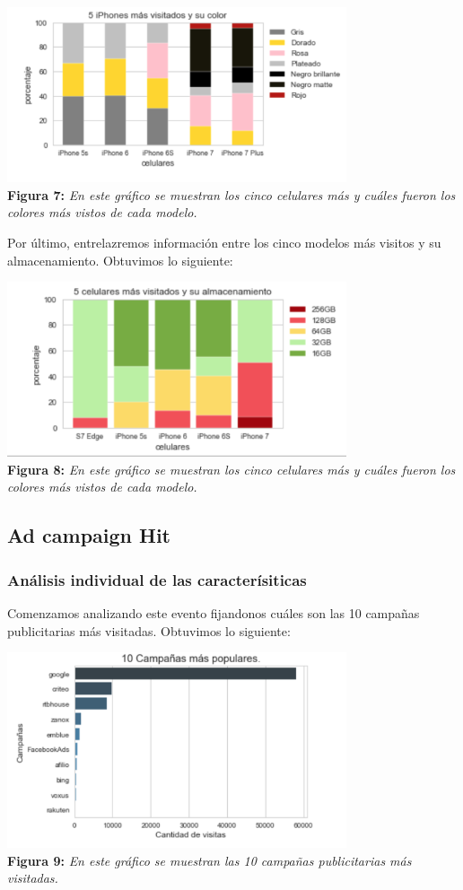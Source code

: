 \documentclass[titlepage,a4paper]{article}
\begin{document}
	\begin{center}
	\includegraphics[width=10cm]{cincoModMasVisitadosColor.jpg}\\
	\textbf{Figura 7:}  \textit{En este gráfico se muestran los cinco celulares más y cuáles fueron los colores más vistos de cada modelo. }
	\end{center}
	Por último, entrelazremos información entre los cinco modelos más visitos y su almacenamiento. Obtuvimos lo siguiente: 
	\begin{center}
	\includegraphics[width=10cm] {cincoModMasVisitadosAlmacenamiento.jpg}\\
	\textbf{Figura 8:}  \textit{En este gráfico se muestran los cinco celulares más y cuáles fueron los colores más vistos de cada modelo. }
	\end{center}
	
	\subsection{Ad campaign Hit}
	\subsubsection{Análisis individual de las caracterísiticas}
	Comenzamos analizando este evento fijandonos cuáles son las 10 campañas publicitarias más visitadas. Obtuvimos lo siguiente:
	\begin{center}
	\includegraphics[width=10cm] {10campaniasmasPopulares.jpg}\\
	\textbf{Figura 9:}  \textit{En este gráfico se muestran las 10 campañas publicitarias más visitadas.  }
	\end{center}
\end{document}
